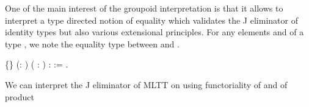   \label{sec:extprinc}
  One of the main interest of the groupoid interpretation is that it
  allows to interpret a type directed notion of equality which validates 
  the J eliminator of identity types but also various extensional principles.
  For any elements  and  of a type , we note    the equality type
  between  and .
\begin{coqdoccode}
\coqdocemptyline
\coqdocnoindent
{}  \{\} (:  ) (  :  ) \coqdoceol
\coqdocindent{1.00em}
:   := \coqdocnotation{(} \coqdocvar{$\gamma$} \coqdocnotation{(} \coqdocnotation{$\star$} \coqdocvariable{$\gamma$}   \coqdocnotation{$\star$} \coqdocvariable{$\gamma$} \coqdocnotation{;} \coqdocvar{\_}\coqdocnotation{);}    \coqdocnotation{)}.\coqdoceol
\coqdocemptyline
\coqdocemptyline
\end{coqdoccode}
We can interpret the J eliminator of MLTT on  using functoriality of  and of product 

